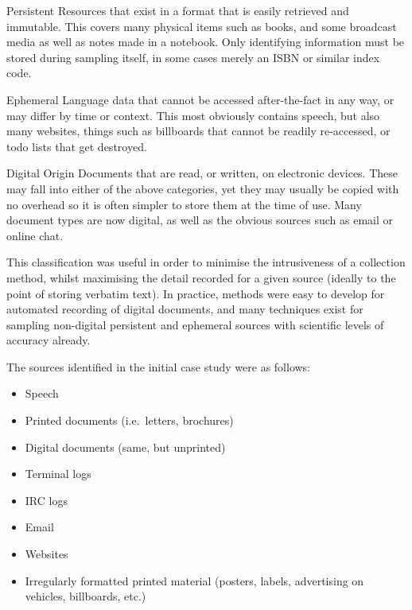 \begin{itemizeTitle}
    \item[Persistent] Resources that exist in a format that is easily retrieved and immutable.  This covers many physical items such as books, and some broadcast media as well as notes made in a notebook.  Only identifying information must be stored during sampling itself, in some cases merely an ISBN or similar index code.
    \item[Ephemeral] Language data that cannot be accessed after-the-fact in any way, or may differ by time or context.  This most obviously contains speech, but also many websites, things such as billboards that cannot be readily re-accessed, or todo lists that get destroyed.
    \item[Digital Origin] Documents that are read, or written, on electronic devices.  These may fall into either of the above categories, yet they may usually be copied with no overhead so it is often simpler to store them at the time of use.  Many document types are now digital, as well as the obvious sources such as email or online chat.
\end{itemizeTitle}

This classification was useful in order to minimise the intrusiveness of a collection method, whilst maximising the detail recorded for a given source (ideally to the point of storing verbatim text).  In practice, methods were easy to develop for automated recording of digital documents, and many techniques exist for sampling non-digital persistent and ephemeral sources with scientific levels of accuracy already.

The sources identified in the initial case study were as follows:

\begin{itemize}
    \item Speech
    \item Printed documents (i.e.\ letters, brochures)
    \item Digital documents (same, but unprinted)
    \item Terminal logs
    \item IRC logs
    \item Email
    \item Websites
    \item Irregularly formatted printed material (posters, labels, advertising on vehicles, billboards, etc.)
\end{itemize}

